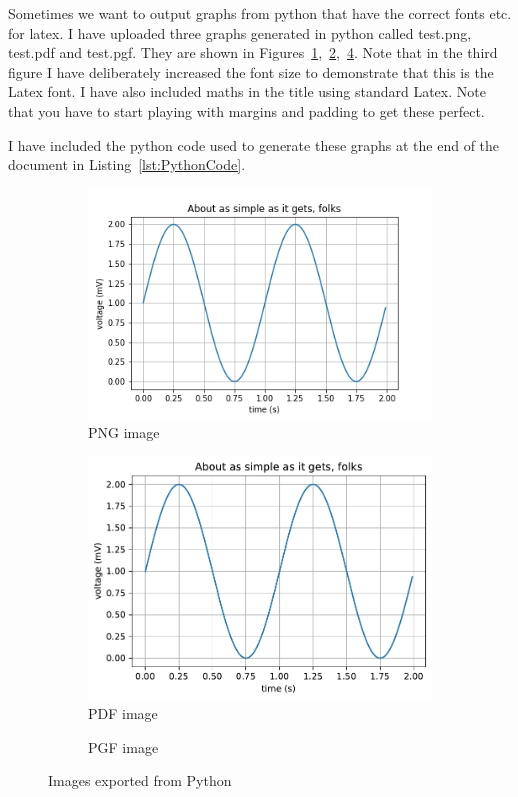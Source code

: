 \documentclass{article}
\begin{document}
Sometimes we want to output graphs from python that have the correct fonts etc. for latex. I have uploaded three graphs generated in python called \textsf{test.png}, \textsf{test.pdf} and \textsf{test.pgf}. They are shown in Figures~\ref{fig:png},~\ref{fig:pdf},~\ref{fig:pgf}. Note that in the third figure I have deliberately increased the font size to demonstrate that this is the Latex font. I have also included maths in the title using standard Latex. Note that you have to start playing with margins and padding to get these perfect.

I have included the python code used to generate these graphs at the end of the document in Listing~\ref{lst:PythonCode}.


\begin{figure}
	\centering
	\begin{subfigure}{0.4\textwidth}
		\includegraphics[width=\linewidth]{images/test.png}
        \caption{PNG image\label{fig:png}}
	\end{subfigure}
	\begin{subfigure}{0.4\textwidth}
		\includegraphics[width=\linewidth]{images/test.pdf}
        \caption{PDF image\label{fig:pdf}}
	\end{subfigure}
	\begin{subfigure}{0.4\textwidth}
		\resizebox{\textwidth}{!}{}
          \caption{PGF image\label{fig:pgf}}
	\end{subfigure}
\caption{Images exported from Python}
\end{figure}
\end{document}
